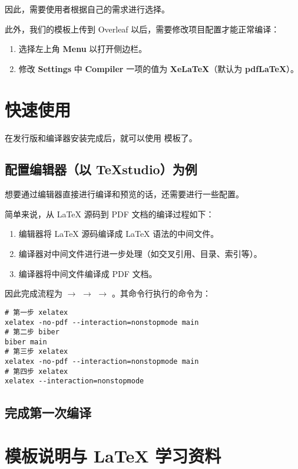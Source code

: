 因此，需要使用者根据自己的需求进行选择。

此外，我们的模板上传到 Overleaf 以后，需要修改项目配置才能正常编译：
\begin{enumerate}
  \item 选择左上角 \textbf{Menu} 以打开侧边栏。
  \item 修改 \textbf{Settings} 中 \textbf{Compiler} 一项的值为 \textbf{XeLaTeX}（默认为 \textbf{pdfLaTeX}）。
\end{enumerate}

\section{快速使用}

在发行版和编译器安装完成后，就可以使用 \BIThesis{}模板了。

\subsection{配置编辑器（以 TeXstudio）为例}

想要通过编辑器直接进行编译和预览的话，还需要进行一些配置。

简单来说，从 \LaTeX{} 源码到 PDF 文档的编译过程如下：
\begin{enumerate}
  \item 编辑器将 \LaTeX{} 源码编译成 \LaTeX{} 语法的中间文件。
  \item 编译器对中间文件进行进一步处理（如交叉引用、目录、索引等）。
  \item 编译器将中间文件编译成 PDF 文档。
\end{enumerate}

因此完成流程为   $\rightarrow$  $\rightarrow$  $\rightarrow$  。其命令行执行的命令为：

\begin{verbatim}
# 第一步 xelatex
xelatex -no-pdf --interaction=nonstopmode main
# 第二步 biber
biber main
# 第三步 xelatex
xelatex -no-pdf --interaction=nonstopmode main
# 第四步 xelatex
xelatex --interaction=nonstopmode

\end{verbatim}

\subsection{完成第一次编译}

\section{模板说明与 LaTeX 学习资料}

